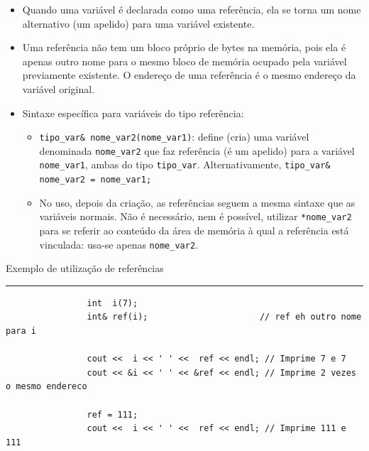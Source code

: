 \documentclass{article}
\begin{document}
	\begin{itemize}
		\item Quando uma variável é declarada como uma referência, ela se torna um nome alternativo (um apelido) para uma variável existente.
		\item Uma referência não tem um bloco próprio de bytes na memória, pois ela é apenas outro nome para o mesmo bloco de memória ocupado pela variável previamente existente. O endereço de uma referência é o mesmo endereço da variável original.
		\item Sintaxe específica para variáveis do tipo referência:
		\begin{itemize}
			\item \texttt{tipo\_var\& nome\_var2(nome\_var1)}: define (cria) uma variável denominada \texttt{nome\_var2} que faz referência (é um apelido) para a variável \texttt{nome\_var1}, ambas do tipo \texttt{tipo\_var}. Alternativamente, \texttt{tipo\_var\& nome\_var2 = nome\_var1;}
			\item No uso, depois da criação, as referências seguem a mesma sintaxe que as variáveis normais. Não é necessário, nem é possível, utilizar \texttt{*nome\_var2} para se referir ao conteúdo da área de memória à qual a referência está vinculada: usa-se apenas \texttt{nome\_var2}.
		\end{itemize}
	\end{itemize}
	
	\vspace{1.5em}
	
	\begin{lrbox}{\caixadecodigo}
		\begin{minipage}{\dimexpr\textwidth-2\fboxsep-2\fboxrule\relax}
			\begin{center}
				Exemplo de utilização de referências
			\end{center}
			\hrule
			\vspace{0.5em}
			\begin{verbatim}
				int  i(7);
				int& ref(i);                      // ref eh outro nome para i
				
				cout <<  i << ' ' <<  ref << endl; // Imprime 7 e 7
				cout << &i << ' ' << &ref << endl; // Imprime 2 vezes o mesmo endereco
				
				ref = 111;
				cout <<  i << ' ' <<  ref << endl; // Imprime 111 e 111
			\end{verbatim}
			\vspace{0.2em}
		\end{minipage}
	\end{lrbox}
	
\end{document}
